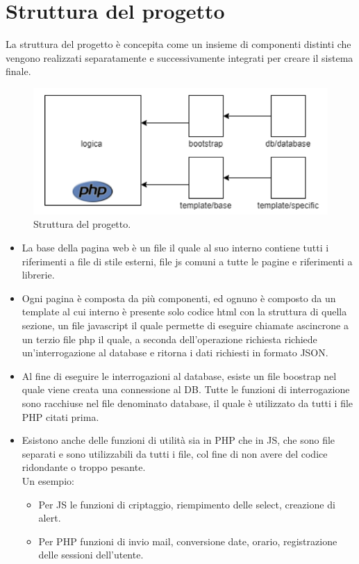 \documentclass[a4paper,final,12pt]{report}
\begin{document}
\section{Struttura del progetto}
La struttura del progetto è concepita come un insieme di componenti distinti che vengono realizzati separatamente e successivamente integrati per creare il sistema finale.
\begin{figure}[hbtp]
\centering
\includegraphics[scale=0.60]{img_concettuale/struttura.png}
\caption{Struttura del progetto.}
\end{figure}
\begin{itemize}
\item La base della pagina web è un file il quale al suo interno contiene tutti i riferimenti a file di stile esterni, file js comuni a tutte le pagine e riferimenti a librerie.
\item Ogni pagina è composta da più componenti, ed ognuno è composto da un template al cui interno è presente solo codice html con la struttura di quella sezione, un file javascript il quale permette di eseguire chiamate ascincrone a un terzio file php il quale, a seconda dell'operazione richiesta richiede un'interrogazione al database e ritorna i dati richiesti in formato JSON.
\item Al fine di eseguire le interrogazioni al database, esiste un file boostrap nel quale viene creata una connessione al DB.
Tutte le funzioni di interrogazione sono racchiuse nel file denominato database, il quale è utilizzato da tutti i file PHP citati prima.
\item Esistono anche delle funzioni di utilità sia in PHP che in JS, che sono file separati e sono utilizzabili da tutti i file, col fine di non avere del codice ridondante o troppo pesante.\\ Un esempio:
\begin{itemize}
 \item Per JS le funzioni di criptaggio, riempimento delle select, creazione di alert.
 \item Per PHP funzioni di invio mail, conversione date, orario, registrazione delle sessioni dell'utente. 
 \end{itemize} 
\end{itemize}
\end{document}
